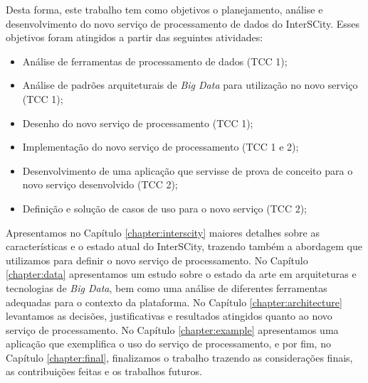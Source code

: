 Desta forma, este trabalho tem como objetivos o planejamento, análise e
desenvolvimento do novo serviço de processamento de dados do InterSCity. Esses
objetivos foram atingidos a partir das seguintes atividades:
\begin{itemize}
  \item Análise de ferramentas de processamento de dados (TCC 1);
  \item Análise de padrões arquiteturais de \textit{Big Data} para utilização no
  novo serviço (TCC 1);
  \item Desenho do novo serviço de processamento (TCC 1);
  \item Implementação do novo serviço de processamento (TCC 1 e 2);
  \item Desenvolvimento de uma aplicação que servisse de prova de conceito para o
    novo serviço desenvolvido (TCC 2);
  \item Definição e solução de casos de uso para o novo serviço (TCC 2);
\end{itemize}

Apresentamos no Capítulo \ref{chapter:interscity} maiores detalhes sobre as
características e o estado atual do InterSCity, trazendo também a abordagem que
utilizamos para definir o novo serviço de processamento. No Capítulo
\ref{chapter:data} apresentamos um estudo sobre o estado da arte em arquiteturas
e tecnologias de \textit{Big Data}, bem como uma análise de diferentes
ferramentas adequadas para o contexto da plataforma. No Capítulo
\ref{chapter:architecture} levantamos as decisões, justificativas e resultados
atingidos quanto ao novo serviço de processamento. No Capítulo
\ref{chapter:example} apresentamos uma aplicação que exemplifica o uso do serviço
de processamento, e por fim, no Capítulo
\ref{chapter:final}, finalizamos o trabalho trazendo as considerações
finais, as contribuições feitas e os trabalhos futuros.
